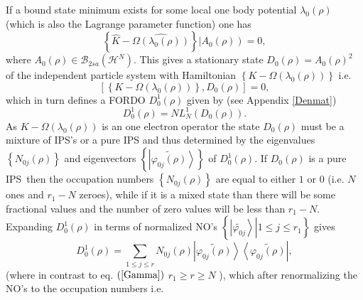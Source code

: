 \documentclass[aps,preprint]{revtex4}%
\begin{document}
If a bound state minimum exists for some local one body potential $\lambda
_{0}\left(  \rho\right)  $ (which is also the Lagrange parameter function) one
has
\begin{equation}
\left\{  \widehat{K}-\widehat{\Omega\left(  \lambda_{0}\left(  \rho\right)
\right)  }\right\}  \left\vert A_{0}\left(  \rho\right)  \right)  =0,
\end{equation}
where $A_{0}\left(  \rho\right)  \in\mathcal{B}_{2sa}\left(  \mathcal{H}%
^{N}\right)  $. This gives a stationary state $D_{0}\left(  \rho\right)
=A_{0}\left(  \rho\right)  ^{2}$ of the independent particle system with
Hamiltonian $\left\{  K-\Omega\left(  \lambda_{0}\left(  \rho\right)  \right)
\right\}  $ i.e.
\begin{equation}
\left[  \left\{  K-\Omega\left(  \lambda_{0}\left(  \rho\right)  \right)
\right\}  ,D_{0}\left(  \rho\right)  \right]  =0,
\end{equation}
which in turn defines a FORDO $D_{0}^{1}\left(  \rho\right)  $ given by (see
Appendix \ref{Denmat})
\begin{equation}
D_{0}^{1}\left(  \rho\right)  =NL_{N}^{1}\left(  D_{0}\left(  \rho\right)
\right)  .
\end{equation}
As $K-\Omega\left(  \lambda_{0}\left(  \rho\right)  \right)  $ is an one
electron operator the state $D_{0}\left(  \rho\right)  $ must be a mixture of
IPS's or a pure IPS and thus determined by the eigenvalues $\left\{
N_{0j}\left(  \rho\right)  \right\}  $ and eigenvectors $\left\{  \left\vert
\widetilde{\varphi_{0j}\left(  \rho\right)  }\right\rangle \right\}  $ of
$D_{0}^{1}\left(  \rho\right)  $. If $D_{0}\left(  \rho\right)  $ is a pure
IPS\ then the occupation numbers $\left\{  N_{0j}\left(  \rho\right)
\right\}  $ are equal to either $1$ or $0$ (i.e. $N$ ones and $r_{1}-N$
zeroes), while if it is a mixed state than there will be some fractional
values and the number of zero values will be less than $r_{1}-N$. Expanding
$D_{0}^{1}\left(  \rho\right)  $ in terms of normalized NO's $\left\{  \left.
\left\vert \widetilde{\varphi_{0j}}\right\rangle \right\vert 1\leq j\leq
r_{1}\right\}  $ gives
\begin{equation}
D_{0}^{1}\left(  \rho\right)  =\sum_{1\leq j\leq r}N_{0j}\left(  \rho\right)
\left\vert \widetilde{\varphi_{0j}\left(  \rho\right)  }\right\rangle
\left\langle \widetilde{\varphi_{0j}\left(  \rho\right)  }\right\vert ,
\end{equation}
(where in contrast to eq. $\left(  \ref{Gamma}\right)  $ $r_{1}\geq r\geq N$
), which after renormalizing the NO's to the occupation numbers i.e.
\end{document}
